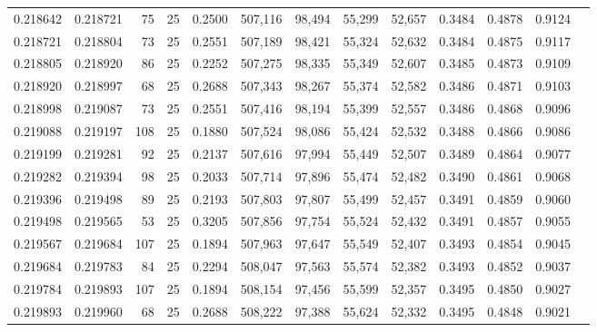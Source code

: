 \begin{tabular}{rrrrrrrrrrrrr}
0.218642 & 0.218721 &    75 &  25 &                                     0.2500 & 507,116 &  98,494 &  55,299 &  52,657 & 0.3484 & 0.4878 & 0.9124 \\
0.218721 & 0.218804 &    73 &  25 &                                     0.2551 & 507,189 &  98,421 &  55,324 &  52,632 & 0.3484 & 0.4875 & 0.9117 \\
0.218805 & 0.218920 &    86 &  25 &                                     0.2252 & 507,275 &  98,335 &  55,349 &  52,607 & 0.3485 & 0.4873 & 0.9109 \\
0.218920 & 0.218997 &    68 &  25 &                                     0.2688 & 507,343 &  98,267 &  55,374 &  52,582 & 0.3486 & 0.4871 & 0.9103 \\
0.218998 & 0.219087 &    73 &  25 &                                     0.2551 & 507,416 &  98,194 &  55,399 &  52,557 & 0.3486 & 0.4868 & 0.9096 \\
0.219088 & 0.219197 &   108 &  25 &                                     0.1880 & 507,524 &  98,086 &  55,424 &  52,532 & 0.3488 & 0.4866 & 0.9086 \\
0.219199 & 0.219281 &    92 &  25 &                                     0.2137 & 507,616 &  97,994 &  55,449 &  52,507 & 0.3489 & 0.4864 & 0.9077 \\
0.219282 & 0.219394 &    98 &  25 &                                     0.2033 & 507,714 &  97,896 &  55,474 &  52,482 & 0.3490 & 0.4861 & 0.9068 \\
0.219396 & 0.219498 &    89 &  25 &                                     0.2193 & 507,803 &  97,807 &  55,499 &  52,457 & 0.3491 & 0.4859 & 0.9060 \\
0.219498 & 0.219565 &    53 &  25 &                                     0.3205 & 507,856 &  97,754 &  55,524 &  52,432 & 0.3491 & 0.4857 & 0.9055 \\
0.219567 & 0.219684 &   107 &  25 &                                     0.1894 & 507,963 &  97,647 &  55,549 &  52,407 & 0.3493 & 0.4854 & 0.9045 \\
0.219684 & 0.219783 &    84 &  25 &                                     0.2294 & 508,047 &  97,563 &  55,574 &  52,382 & 0.3493 & 0.4852 & 0.9037 \\
0.219784 & 0.219893 &   107 &  25 &                                     0.1894 & 508,154 &  97,456 &  55,599 &  52,357 & 0.3495 & 0.4850 & 0.9027 \\
0.219893 & 0.219960 &    68 &  25 &                                     0.2688 & 508,222 &  97,388 &  55,624 &  52,332 & 0.3495 & 0.4848 & 0.9021 \\

\end{tabular}
